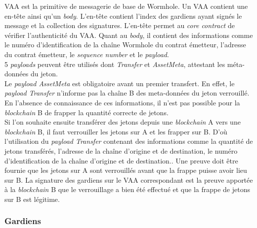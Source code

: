 VAA \cite{wormholeVAA} est la primitive de messagerie de base de Wormhole. Un VAA contient une en-tête 
ainsi qu'un \textit{body}. L'en-tête contient l'index des gardiens ayant signés le message et la collection des signatures.
L'en-tête permet au \textit{core contract} de vérifier l'authenticité du VAA.
Quant au \textit{body}, il contient des informations comme le numéro d'identification de la chaîne 
Wormhole du contrat émetteur, l'adresse du contrat émetteur, le \textit{sequence number} 
et le \textit{payload}.\\ 5 \textit{payloads} peuvent être utilisés dont \textit{Transfer} et 
\textit{AssetMeta}, attestant les méta-données du jeton.\\
Le \textit{payload AssetMeta} est obligatoire avant un premier transfert.
En effet, le \textit{payload Transfer} n'informe pas la chaîne B des meta-données du jeton verrouillé.
En l'absence de connaissance de ces informations, il n'est pas possible pour la \textit{blockchain} B 
de frapper la quantité correcte de jetons.\\
Si l'on souhaite ensuite transférer des jetons depuis une \textit{blockchain} A vers une 
\textit{blockchain} B, il faut verrouiller les jetons sur A et les frapper sur B.
D'où l'utilisation du \textit{payload Transfer} contenant des informations comme la 
quantité de jetons transférés, l'adresse de la chaîne d'origine et de destination, 
le numéro d'identification de la chaîne d'origine et de destination..
Une preuve doit être fournie que les jetons sur A sont verrouillés avant que la frappe puisse 
avoir lieu sur B. La signature des gardiens sur le VAA correspondant est la preuve apportée à 
la \textit{blockchain} B que le verrouillage a bien été effectué et que la frappe de jetons sur 
B est légitime.

\subsubsection{Gardiens}

